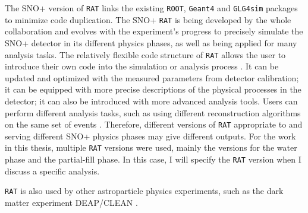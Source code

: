 The SNO+ version of \texttt{RAT} links the existing \texttt{ROOT}, \texttt{Geant4} and \texttt{GLG4sim} packages to minimize code duplication. The SNO+ \texttt{RAT} is being developed by the whole collaboration and evolves with the experiment's progress to precisely simulate the SNO+ detector in its different physics phases, as well as being applied for many analysis tasks. The relatively flexible code structure of \texttt{RAT} allows the user to introduce their own code into the simulation or analysis process \cite{ratManual}. It can be updated and optimized with the measured parameters from detector calibration; it can be equipped with more precise descriptions of the physical processes in the detector; it can also be introduced with more advanced analysis tools. Users can perform different analysis tasks, such as using different reconstruction algorithms on the same set of events \cite{ratManual}. Therefore, different versions of \texttt{RAT} appropriate to and serving different SNO+ physics phases may give different outputs. For the work in this thesis, multiple \texttt{RAT} versions were used, mainly the versions for the water phase and the partial-fill phase. In this case, I will specify the \texttt{RAT} version when I discuss a specific analysis.

\texttt{RAT} is also used by other astroparticle physics experiments, such as the dark matter experiment DEAP/CLEAN \cite{caldwell2014simulation}. 
